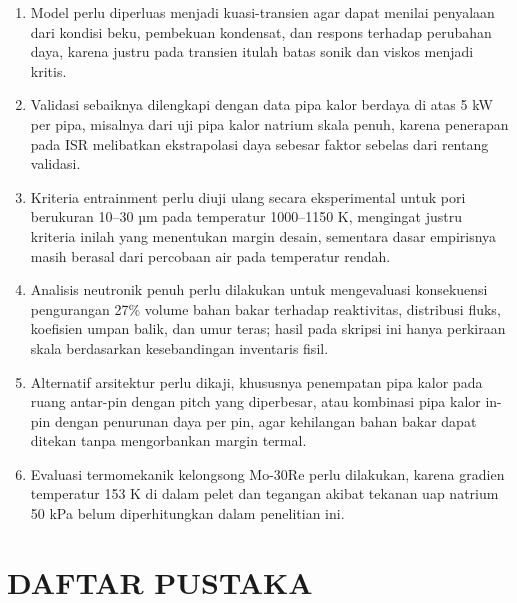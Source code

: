\documentclass[
  indonesian,
  12pt,
  a4paper,
]{report}
\begin{document}
\begin{enumerate}
\def\labelenumi{\arabic{enumi}.}
\item
  Model perlu diperluas menjadi kuasi-transien agar dapat menilai
  penyalaan dari kondisi beku, pembekuan kondensat, dan respons terhadap
  perubahan daya, karena justru pada transien itulah batas sonik dan
  viskos menjadi kritis.
\item
  Validasi sebaiknya dilengkapi dengan data pipa kalor berdaya di atas 5
  kW per pipa, misalnya dari uji pipa kalor natrium skala penuh, karena
  penerapan pada ISR melibatkan ekstrapolasi daya sebesar faktor sebelas
  dari rentang validasi.
\item
  Kriteria entrainment perlu diuji ulang secara eksperimental untuk pori
  berukuran 10--30 µm pada temperatur 1000--1150 K, mengingat justru
  kriteria inilah yang menentukan margin desain, sementara dasar
  empirisnya masih berasal dari percobaan air pada temperatur rendah.
\item
  Analisis neutronik penuh perlu dilakukan untuk mengevaluasi
  konsekuensi pengurangan 27\% volume bahan bakar terhadap reaktivitas,
  distribusi fluks, koefisien umpan balik, dan umur teras; hasil pada
  skripsi ini hanya perkiraan skala berdasarkan kesebandingan inventaris
  fisil.
\item
  Alternatif arsitektur perlu dikaji, khususnya penempatan pipa kalor
  pada ruang antar-pin dengan pitch yang diperbesar, atau kombinasi pipa
  kalor in-pin dengan penurunan daya per pin, agar kehilangan bahan
  bakar dapat ditekan tanpa mengorbankan margin termal.
\item
  Evaluasi termomekanik kelongsong Mo-30Re perlu dilakukan, karena
  gradien temperatur 153 K di dalam pelet dan tegangan akibat tekanan
  uap natrium 50 kPa belum diperhitungkan dalam penelitian ini.
\end{enumerate}

\chapter*{DAFTAR PUSTAKA}\label{daftar-pustaka}
\end{document}
